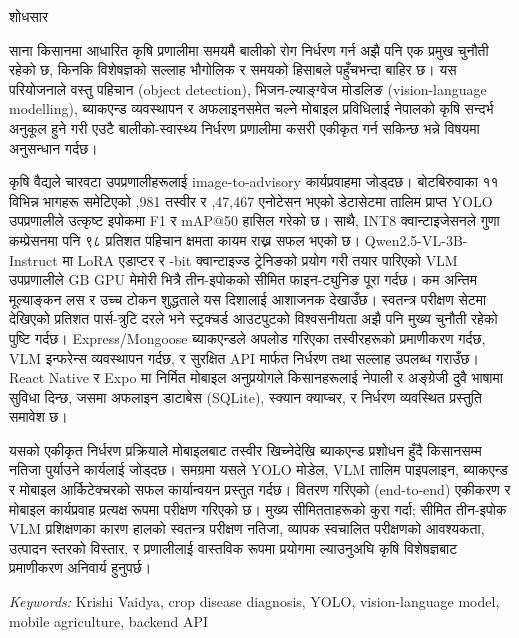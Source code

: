 \clearpage
{}
{\nepalifont
\begin{center}
{\fontsize{16}{18}\selectfont शोधसार}
\end{center}

\vspace{1.5\baselineskip}

साना किसानमा आधारित कृषि प्रणालीमा समयमै बालीको रोग निर्धरण गर्न अझै पनि एक प्रमुख
चुनौती रहेको छ, किनकि विशेषज्ञको सल्लाह भौगोलिक र समयको हिसाबले पहुँचभन्दा बाहिर छ।
यस परियोजनाले वस्तु पहिचान {\normalfont (object detection)}, भिजन-ल्याङ्ग्वेज मोडलिङ
{\normalfont (vision-language modelling)}, ब्याकएन्ड व्यवस्थापन र अफलाइनसमेत चल्ने
मोबाइल प्रविधिलाई नेपालको कृषि सन्दर्भ अनुकूल हुने गरी एउटै बालीको-स्वास्थ्य निर्धरण
प्रणालीमा कसरी एकीकृत गर्न सकिन्छ भन्ने विषयमा अनुसन्धान गर्दछ।

कृषि वैद्यले चारवटा उपप्रणालीहरूलाई {\normalfont image-to-advisory} कार्यप्रवाहमा
जोड्दछ। बोटबिरुवाका ११ विभिन्न भागहरू समेटिएको {,981} तस्वीर र
{,47,467} एनोटेसन भएको डेटासेटमा तालिम प्राप्त {\normalfont YOLO}
उपप्रणालीले उत्कृष्ट इपोकमा {\normalfont F1} {} र
{\normalfont mAP@50} {} हासिल गरेको छ। साथै, {\normalfont INT8}
क्वान्टाइजेसनले {} गुणा कम्प्रेसनमा पनि ९८ प्रतिशत पहिचान क्षमता
कायम राख्न सफल भएको छ। {\normalfont Qwen2.5-VL-3B-Instruct} मा {\normalfont LoRA}
एडाप्टर र {-bit} क्वान्टाइज्ड ट्रेनिङको प्रयोग गरी तयार पारिएको
{\normalfont VLM} उपप्रणालीले { GB} {\normalfont GPU} मेमोरी भित्रै
तीन-इपोकको सीमित फाइन-ट्युनिङ पूरा गर्दछ। कम अन्तिम मूल्याङ्कन लस र उच्च टोकन
शुद्धताले यस दिशालाई आशाजनक देखाउँछ। स्वतन्त्र परीक्षण सेटमा देखिएको
{} प्रतिशत पार्स-त्रुटि दरले भने स्ट्रक्चर्ड आउटपुटको विश्वसनीयता
अझै पनि मुख्य चुनौती रहेको पुष्टि गर्दछ। {\normalfont Express/Mongoose} ब्याकएन्डले अपलोड
गरिएका तस्वीरहरूको प्रमाणीकरण गर्दछ, {\normalfont VLM} इन्फरेन्स व्यवस्थापन गर्दछ,
र सुरक्षित {\normalfont API} मार्फत निर्धरण तथा सल्लाह उपलब्ध गराउँछ।
{\normalfont React Native} र {\normalfont Expo} मा निर्मित मोबाइल अनुप्रयोगले
किसानहरूलाई नेपाली र अङ्ग्रेजी दुवै भाषामा सुविधा दिन्छ, जसमा अफलाइन डाटाबेस
{\normalfont (SQLite)}, स्क्यान क्याप्चर, र निर्धरण व्यवस्थित प्रस्तुति समावेश छ।

यसको एकीकृत निर्धरण प्रक्रियाले मोबाइलबाट तस्वीर खिच्नेदेखि ब्याकएन्ड प्रशोधन हुँदै
किसानसम्म नतिजा पुर्याउने कार्यलाई जोड्दछ। समग्रमा यसले {\normalfont YOLO} मोडेल,
{\normalfont VLM} तालिम पाइपलाइन, ब्याकएन्ड र मोबाइल आर्किटेक्चरको सफल कार्यान्वयन
प्रस्तुत गर्दछ। वितरण गरिएको {\normalfont (end-to-end)} एकीकरण र मोबाइल कार्यप्रवाह
प्रत्यक्ष रूपमा परीक्षण गरिएको छ। मुख्य सीमितताहरूको कुरा गर्दा; सीमित तीन-इपोक
{\normalfont VLM} प्रशिक्षणका कारण हालको स्वतन्त्र परीक्षण नतिजा, व्यापक स्वचालित
परीक्षणको आवश्यकता, उत्पादन स्तरको विस्तार, र प्रणालीलाई वास्तविक रूपमा प्रयोगमा
ल्याउनुअघि कृषि विशेषज्ञबाट प्रमाणीकरण अनिवार्य हुनुपर्छ।
}

\vspace{2\baselineskip}
\noindent\textit{Keywords:} Krishi Vaidya, crop disease diagnosis, YOLO, vision-language model, mobile agriculture, backend API
